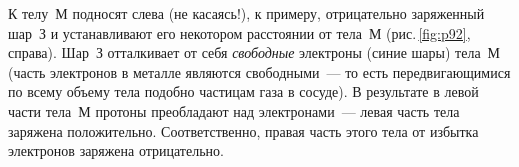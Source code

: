 \documentclass[main.tex]{subfiles}
\begin{document}
\begin{enumerate}
    К телу~М подносят слева (не касаясь!), к примеру, отрицательно заряженный шар~З и устанавливают его некотором расстоянии от тела~М (рис.\,\ref{fig:p92}, справа). Шар~З отталкивает от себя \emph{свободные} электроны (синие шары) тела~М (часть электронов в металле являются свободными~--- то есть передвигающимися по всему объему тела подобно частицам газа в сосуде). 
    В результате в левой части тела~М протоны преобладают над электронами~--- левая часть тела заряжена положительно. Соответственно, правая часть этого тела от избытка электронов заряжена отрицательно. 

    
\end{enumerate}



























 
\end{document}
